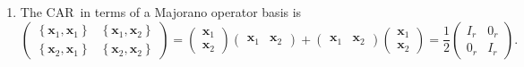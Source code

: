 \documentclass[aps,preprint]{revtex4}
\begin{document}
\begin{enumerate}
\begin{enumerate}
\item The CAR\ in terms of a Majorano operator basis is 
\begin{equation}
\left( 
\begin{array}{cc}
\left\{ \boldsymbol{x}_{1},\boldsymbol{x}_{1}\right\} & \left\{ \boldsymbol{x%
}_{1},\boldsymbol{x}_{2}\right\} \\ 
\left\{ \boldsymbol{x}_{2},\boldsymbol{x}_{1}\right\} & \left\{ \boldsymbol{x%
}_{2},\boldsymbol{x}_{2}\right\}%
\end{array}%
\right) =\left( 
\begin{array}{c}
\boldsymbol{x}_{1} \\ 
\boldsymbol{x}_{2}%
\end{array}%
\right) \left( 
\begin{array}{cc}
\boldsymbol{x}_{1} & \boldsymbol{x}_{2}%
\end{array}%
\right) +\left( 
\begin{array}{cc}
\boldsymbol{x}_{1} & \boldsymbol{x}_{2}%
\end{array}%
\right) \left( 
\begin{array}{c}
\boldsymbol{x}_{1} \\ 
\boldsymbol{x}_{2}%
\end{array}%
\right) =\frac{1}{2}\left( 
\begin{array}{cc}
I_{r} & 0_{r} \\ 
0_{r} & I_{r}%
\end{array}%
\right) .
\end{equation}


\end{enumerate}
\end{enumerate}
\end{document}
